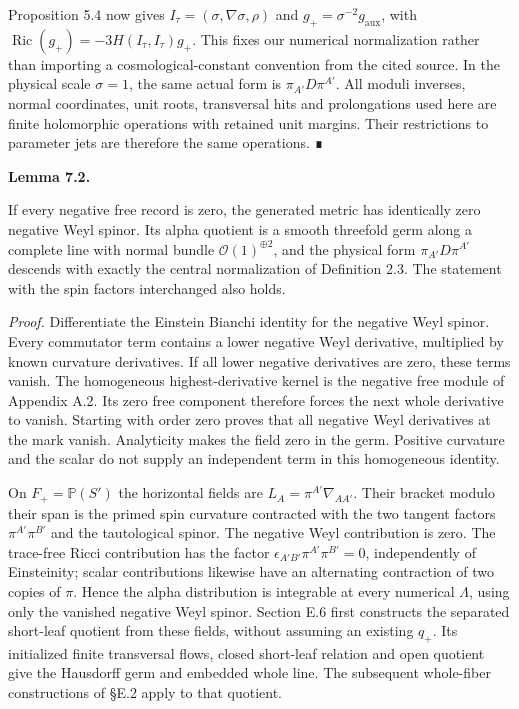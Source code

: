 \documentclass[
  english,
  11pt,
  reqno]{amsart}
\makeatletter
\newcommand{\pandocstatementheading}[1]{%
  \par\addpenalty{\@beginparpenalty}%
  \addvspace{.5\baselineskip plus .2\baselineskip minus .2\baselineskip}%
  {\normalfont\bfseries #1\par}%
  \nobreak\@afterindenttrue\@afterheading
}
\makeatother
\begin{document}
Proposition 5.4 now gives \(I_\tau=(\sigma,\nabla\sigma,\rho)\) and
\(g_+=\sigma^{-2}g_{\mathrm{aux}}\), with
\(\operatorname{Ric}(g_+)=-3H(I_\tau,I_\tau)g_+\). This fixes our
numerical normalization rather than importing a cosmological-constant
convention from the cited source. In the physical scale \(\sigma=1\),
the same actual form is \(\pi_{A'}D\pi^{A'}\). All moduli inverses,
normal coordinates, unit roots, transversal hits and prolongations used
here are finite holomorphic operations with retained unit margins. Their
restrictions to parameter jets are therefore the same operations. ∎

\pandocstatementheading{\protect{}\label{lem:gg-pure-chiral-background}Lemma 7.2.}

If every negative free record is zero, the generated metric has
identically zero negative Weyl spinor. Its alpha quotient is a smooth
threefold germ along a complete line with normal bundle
\(\mathcal O(1)^{\oplus2}\), and the physical form \(\pi_{A'}D\pi^{A'}\)
descends with exactly the central normalization of Definition 2.3. The
statement with the spin factors interchanged also holds.

\emph{Proof.} Differentiate the Einstein Bianchi identity for the
negative Weyl spinor. Every commutator term contains a lower negative
Weyl derivative, multiplied by known curvature derivatives. If all lower
negative derivatives are zero, these terms vanish. The homogeneous
highest-derivative kernel is the negative free module of Appendix A.2.
Its zero free component therefore forces the next whole derivative to
vanish. Starting with order zero proves that all negative Weyl
derivatives at the mark vanish. Analyticity makes the field zero in the
germ. Positive curvature and the scalar do not supply an independent
term in this homogeneous identity.

On \(F_+=\mathbb P(S')\) the horizontal fields are
\(L_A=\pi^{A'}\nabla_{AA'}\). Their bracket modulo their span is the
primed spin curvature contracted with the two tangent factors
\(\pi^{A'}\pi^{B'}\) and the tautological spinor. The negative Weyl
contribution is zero. The trace-free Ricci contribution has the factor
\(\epsilon_{A'B'}\pi^{A'}\pi^{B'}=0\), independently of Einsteinity;
scalar contributions likewise have an alternating contraction of two
copies of \(\pi\). Hence the alpha distribution is integrable at every
numerical \(\Lambda\), using only the vanished negative Weyl spinor.
Section E.6 first constructs the separated short-leaf quotient from
these fields, without assuming an existing \(q_+\). Its initialized
finite transversal flows, closed short-leaf relation and open quotient
give the Hausdorff germ and embedded whole line. The subsequent
whole-fiber constructions of §E.2 apply to that quotient.
\end{document}
